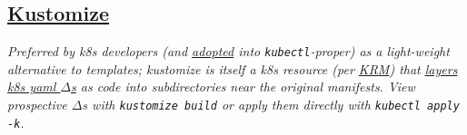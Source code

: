 \begin{comment}
\entry{35mm}{helm completion}{}\\
\entry{35mm}{helm create}{}\\
\entry{35mm}{helm dependency}{}\\
\entry{35mm}{helm env}{}\\
\entry{35mm}{helm get}{}\\
\entry{35mm}{helm history}{}\\
\entry{35mm}{helm install}{}\\
\entry{35mm}{helm lint}{}\\
\entry{35mm}{helm list}{}\\
\entry{35mm}{helm package}{}\\
\entry{35mm}{helm plugin}{}\\
\entry{35mm}{helm pull}{}\\
\entry{35mm}{helm repo}{}\\
\entry{35mm}{helm rollback}{}\\
\entry{35mm}{helm search}{}\\
\entry{35mm}{helm show}{}\\
\entry{35mm}{helm status}{}\\
\entry{35mm}{helm template}{}\\
\entry{35mm}{helm test}{}\\
\entry{35mm}{helm uninstall}{}\\
\entry{35mm}{helm upgrade}{}\\
\entry{35mm}{helm verify}{}\\
\entry{35mm}{helm version}{}\\
\end{comment}


\subsection*{\href{https://kubectl.docs.kubernetes.io/references/kustomize/kustomization/}{Kustomize}}

{\footnotesize \textit{Preferred by k8s developers (and \href{https://kubernetes.io/blog/2019/03/25/kubernetes-1-14-release-announcement/}{adopted} into {\tt kubectl}-proper) as a light-weight alternative to templates; kustomize is itself a k8s resource (per \href{https://github.com/kubernetes/community/blob/master/contributors/design-proposals/architecture/resource-management.md}{KRM}) that \href{https://github.com/kubernetes-sigs/kustomize}{layers k8s yaml $\Delta$s} as code into subdirectories near the original manifests. View prospective $\Delta$s with {\tt kustomize build} or apply them directly with {\tt kubectl apply -k}.}}\\
